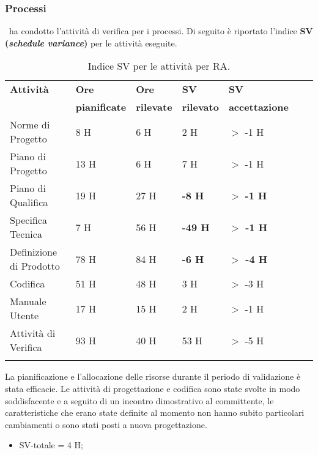 \subsubsection{Processi}
\gruppo ~ha condotto l'attività di verifica per i processi. Di seguito è riportato l'indice \textbf{SV (\textit{schedule variance})} per le attività eseguite.
\begin{longtable}{lllllXr}
\toprule
\textbf{Attività} & \textbf{Ore} & \textbf{Ore} & \textbf{SV} & \textbf{SV} \\
& \textbf{pianificate} & \textbf{rilevate} & \textbf{rilevato} & \textbf{accettazione}\\
\toprule
Norme di Progetto & 8 H & 6 H & 2 H & $>$ -1 H\\
\midrule
Piano di Progetto & 13 H & 6 H & 7 H & $>$ -1 H\\
\midrule
Piano di Qualifica & 19 H & 27 H & \textbf{-8 H} & $>$ \textbf{-1 H}\\
\midrule
Specifica Tecnica & 7 H & 56 H & \textbf{-49 H} & \textbf{$>$ -1 H}\\
\midrule
Definizione di Prodotto & 78 H & 84 H & \textbf{-6 H} & \textbf{$>$ -4 H}\\
\midrule
Codifica & 51 H & 48 H & 3 H & $>$ -3 H\\
\midrule
Manuale Utente & 17 H & 15 H & 2 H & $>$ -1 H\\
\midrule
Attività di Verifica & 93 H & 40 H & 53 H & $>$ -5 H\\
\bottomrule
\caption{Indice SV per le attività per RA.}
\end{longtable}
La pianificazione e l'allocazione delle risorse durante il periodo di validazione è stata efficacie. Le attività di progettazione e codifica sono state svolte in modo soddisfacente e a seguito di un incontro dimostrativo al committente, le caratteristiche che erano state definite al momento non hanno subito particolari cambiamenti o sono stati posti a nuova progettazione.
\begin{itemize}
\item SV-totale = 4 H;
\end{itemize}

